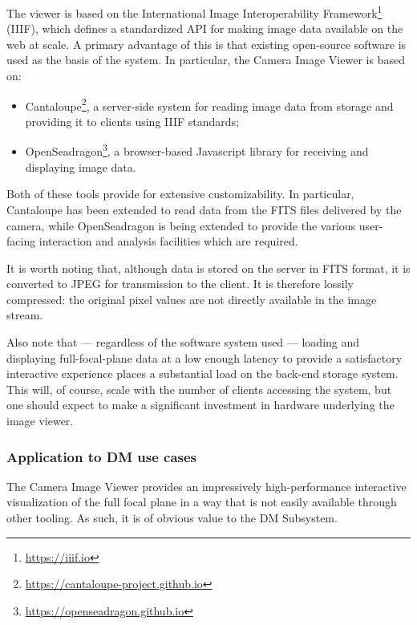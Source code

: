 The viewer is based on the International Image Interoperability Framework\footnote{\url{https://iiif.io}} (IIIF), which defines a standardized API for making image data available on the web at scale.
A primary advantage of this is that existing open-source software is used as the basis of the system.
In particular, the Camera Image Viewer is based on:

\begin{itemize}

  \item{Cantaloupe\footnote{\url{https://cantaloupe-project.github.io}}, a server-side system for reading image data from storage and providing it to clients using IIIF standards;}
  \item{OpenSeadragon\footnote{\url{https://openseadragon.github.io}}, a browser-based Javascript library for receiving and displaying image data.}

\end{itemize}

Both of these tools provide for extensive customizability.
In particular, Cantaloupe has been extended to read data from the FITS files delivered by the camera, while OpenSeadragon is being extended to provide the various user-facing interaction and analysis facilities which are required.

It is worth noting that, although data is stored on the server in FITS format, it is converted to JPEG for transmission to the client.
It is therefore lossily compressed: the original pixel values are not directly available in the image stream.

Also note that --- regardless of the software system used --- loading and displaying full-focal-plane data at a low enough latency to provide a satisfactory interactive experience places a substantial load on the back-end storage system.
This will, of course, scale with the number of clients accessing the system, but one should expect to make a significant investment in hardware underlying the image viewer.

\subsubsection{Application to DM use cases}

The Camera Image Viewer provides an impressively high-performance interactive visualization of the full focal plane in a way that is not easily available through other tooling.
As such, it is of obvious value to the DM Subsystem.

